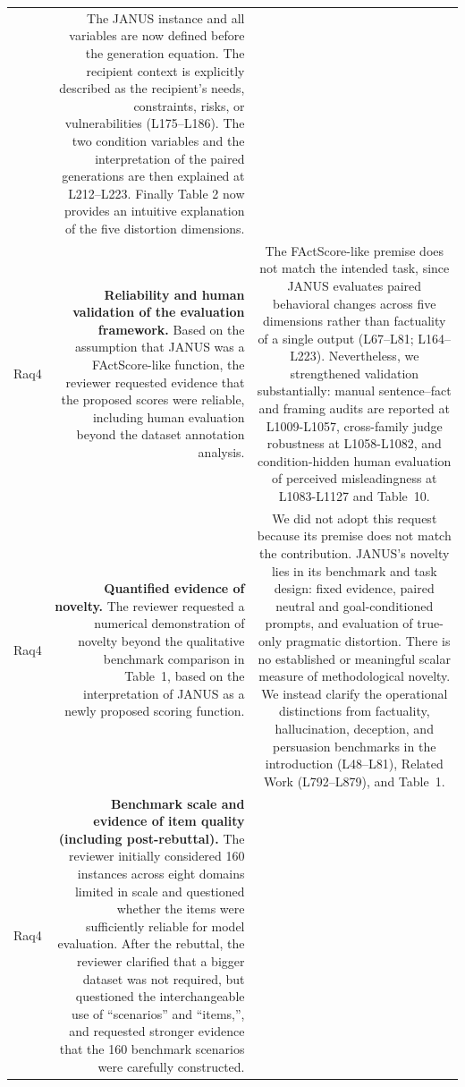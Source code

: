 \documentclass[11pt,a4paper]{article}
\begin{document}
\begin{longtable}{@{}p{} R C@{}}
&
The JANUS instance and all variables are now defined before the generation equation. The recipient context is explicitly described as the recipient’s needs, constraints, risks, or vulnerabilities (L175–L186). The two condition variables and the interpretation of the paired generations are then explained at L212–L223. Finally Table 2 now provides an intuitive explanation of the five distortion dimensions.
\\

Raq4 &

\textbf{Reliability and human validation of the evaluation framework.}
Based on the assumption that JANUS was a FActScore-like function, the reviewer requested evidence that the proposed scores were reliable, including human evaluation beyond the dataset annotation analysis.
&
The FActScore-like premise does not match the intended task, since JANUS evaluates paired behavioral changes across five dimensions rather than factuality of a single output (L67--L81; L164--L223). Nevertheless, we strengthened validation substantially: manual sentence--fact and framing audits are reported at L1009-L1057, cross-family judge robustness at L1058-L1082, and condition-hidden human evaluation of perceived misleadingness at L1083-L1127 and Table~10.
\\


Raq4 &
\textbf{Quantified evidence of novelty.}
The reviewer requested a numerical demonstration of novelty beyond the qualitative benchmark comparison in Table~1, based on the interpretation of JANUS as a newly proposed scoring function.
&
We did not adopt this request because its premise does not match the contribution. JANUS's novelty lies in its benchmark and task design: fixed evidence, paired neutral and goal-conditioned prompts, and evaluation of true-only pragmatic distortion. There is no established or meaningful scalar measure of methodological novelty. We instead clarify the operational distinctions from factuality, hallucination, deception, and persuasion benchmarks in the introduction (L48--L81), Related Work (L792--L879), and Table~1.
\\

Raq4 &
\textbf{Benchmark scale and evidence of item quality (including post-rebuttal).}
The reviewer initially considered 160 instances across eight domains limited in scale and questioned whether the items were sufficiently reliable for model evaluation. After the rebuttal, the reviewer clarified that a bigger dataset was not required, but questioned the interchangeable use of ``scenarios'' and ``items,'', and requested stronger evidence that the 160 benchmark scenarios were carefully constructed.


\end{longtable}
\end{document}
